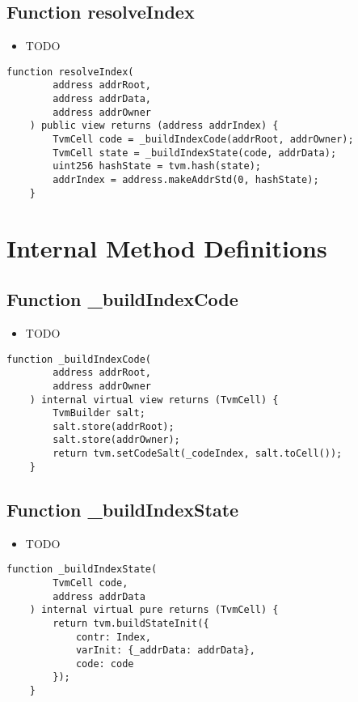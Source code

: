 \subsection{Function resolveIndex}

\begin{itemize}
\item TODO
\end{itemize}

\begin{lstlisting}[firstnumber=20]
    function resolveIndex(
        address addrRoot,
        address addrData,
        address addrOwner
    ) public view returns (address addrIndex) {
        TvmCell code = _buildIndexCode(addrRoot, addrOwner);
        TvmCell state = _buildIndexState(code, addrData);
        uint256 hashState = tvm.hash(state);
        addrIndex = address.makeAddrStd(0, hashState);
    }
\end{lstlisting}

\section{Internal Method Definitions}


\subsection{Function \_{}buildIndexCode}

\begin{itemize}
\item TODO
\end{itemize}

\begin{lstlisting}[firstnumber=31]
    function _buildIndexCode(
        address addrRoot,
        address addrOwner
    ) internal virtual view returns (TvmCell) {
        TvmBuilder salt;
        salt.store(addrRoot);
        salt.store(addrOwner);
        return tvm.setCodeSalt(_codeIndex, salt.toCell());
    }
\end{lstlisting}

\subsection{Function \_{}buildIndexState}

\begin{itemize}
\item TODO
\end{itemize}

\begin{lstlisting}[firstnumber=41]
    function _buildIndexState(
        TvmCell code,
        address addrData
    ) internal virtual pure returns (TvmCell) {
        return tvm.buildStateInit({
            contr: Index,
            varInit: {_addrData: addrData},
            code: code
        });
    }
\end{lstlisting}
